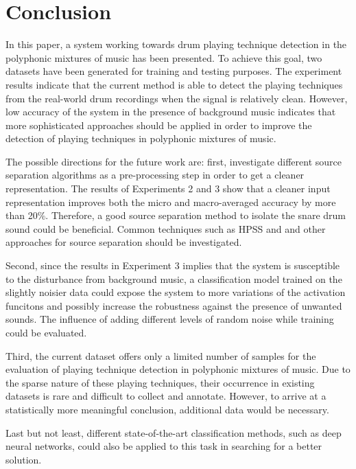 \documentclass{article}
\begin{document}

\section{Conclusion}
\label{sec:conclusion}
In this paper, a system working towards drum playing technique detection in the polyphonic mixtures of music has been presented. To achieve this goal, two datasets have been generated for training and testing purposes. The experiment results indicate that the current method is able to detect the playing techniques from the real-world drum recordings when the signal is relatively clean. However, low accuracy of the system in the presence of background music indicates that more sophisticated approaches should be applied in order to improve the detection of playing techniques in polyphonic mixtures of music. 

The possible directions for the future work are: first, investigate different source separation algorithms as a pre-processing step in order to get a cleaner representation. The results of Experiments 2 and 3 show that a cleaner input representation improves both the micro and macro-averaged accuracy by more than 20\%. Therefore, a good source separation method to isolate the snare drum sound could be beneficial. Common techniques such as HPSS and and other approaches for source separation should be investigated.

Second, since the results in Experiment 3 implies that the system is susceptible to the disturbance from background music, a classification model trained on the slightly noisier data could {\color{red} expose the system to more variations of the activation funcitons and} possibly increase the robustness against the presence of unwanted sounds. The influence of adding different levels of random noise while training could be evaluated. 

Third, the current dataset offers only a limited number of samples for the evaluation of playing technique detection in polyphonic mixtures of music. Due to the sparse nature of these playing techniques, their occurrence in existing datasets is rare and difficult to collect and annotate. However, to arrive at a statistically more meaningful conclusion, additional data would be necessary. 

Last but not least, different state-of-the-art classification methods, such as deep neural networks, could also be applied to this task in searching for a better solution.
\end{document}
